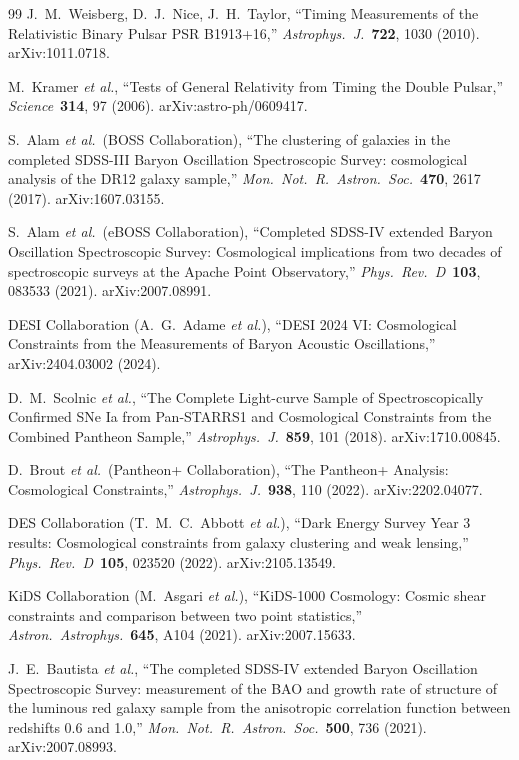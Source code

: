 \documentclass[11pt,a4paper]{article}
\theoremstyle{definition}
\begin{document}
\begin{thebibliography}{99}
J.~M.~Weisberg, D.~J.~Nice, J.~H.~Taylor, ``Timing Measurements of the Relativistic Binary Pulsar PSR B1913+16,'' \emph{Astrophys.\ J.}\ \textbf{722}, 1030 (2010). arXiv:1011.0718.

M.~Kramer \emph{et al.}, ``Tests of General Relativity from Timing the Double Pulsar,'' \emph{Science}\ \textbf{314}, 97 (2006). arXiv:astro-ph/0609417.

S.~Alam \emph{et al.}\ (BOSS Collaboration), ``The clustering of galaxies in the completed SDSS-III Baryon Oscillation Spectroscopic Survey: cosmological analysis of the DR12 galaxy sample,'' \emph{Mon.\ Not.\ R.\ Astron.\ Soc.}\ \textbf{470}, 2617 (2017). arXiv:1607.03155.

S.~Alam \emph{et al.}\ (eBOSS Collaboration), ``Completed SDSS-IV extended Baryon Oscillation Spectroscopic Survey: Cosmological implications from two decades of spectroscopic surveys at the Apache Point Observatory,'' \emph{Phys.\ Rev.\ D}\ \textbf{103}, 083533 (2021). arXiv:2007.08991.

DESI Collaboration (A.~G.~Adame \emph{et al.}), ``DESI 2024 VI: Cosmological Constraints from the Measurements of Baryon Acoustic Oscillations,'' arXiv:2404.03002 (2024).

D.~M.~Scolnic \emph{et al.}, ``The Complete Light-curve Sample of Spectroscopically Confirmed SNe Ia from Pan-STARRS1 and Cosmological Constraints from the Combined Pantheon Sample,'' \emph{Astrophys.\ J.}\ \textbf{859}, 101 (2018). arXiv:1710.00845.

D.~Brout \emph{et al.}\ (Pantheon+ Collaboration), ``The Pantheon+ Analysis: Cosmological Constraints,'' \emph{Astrophys.\ J.}\ \textbf{938}, 110 (2022). arXiv:2202.04077.

DES Collaboration (T.~M.~C.~Abbott \emph{et al.}), ``Dark Energy Survey Year 3 results: Cosmological constraints from galaxy clustering and weak lensing,'' \emph{Phys.\ Rev.\ D}\ \textbf{105}, 023520 (2022). arXiv:2105.13549.

KiDS Collaboration (M.~Asgari \emph{et al.}), ``KiDS-1000 Cosmology: Cosmic shear constraints and comparison between two point statistics,'' \emph{Astron.\ Astrophys.}\ \textbf{645}, A104 (2021). arXiv:2007.15633.

J.~E.~Bautista \emph{et al.}, ``The completed SDSS-IV extended Baryon Oscillation Spectroscopic Survey: measurement of the BAO and growth rate of structure of the luminous red galaxy sample from the anisotropic correlation function between redshifts 0.6 and 1.0,'' \emph{Mon.\ Not.\ R.\ Astron.\ Soc.}\ \textbf{500}, 736 (2021). arXiv:2007.08993.


\end{thebibliography}
\end{document}

